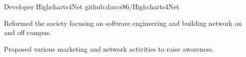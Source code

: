 \begin{cventries}

\cventry
{Developer} %
{Highcharts4Net} %
{github:davcs86/Highcharts4Net} %
{ } %
{ %
	\begin{cvitems}
		\item {Reformed the society focusing on software engineering and building network on and off campus.}
		\item {Proposed various marketing and network activities to raise awareness.}
	\end{cvitems}
}

\end{cventries}